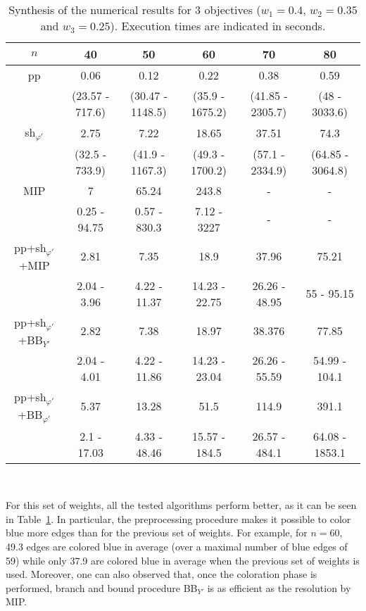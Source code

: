 \documentclass[final,3p,times]{elsarticle}
\begin{document}
\begin{table}[!h]
  \begin{center}
  {\small \begin{tabular}{|c|ccccc|}    \hline
      \rule[1pt]{0pt}{13pt} 
   $n$ & 40&50&60&70&80\\
    \hline
    pp  &0.06&0.12&0.22&0.38&0.59\\
    	 &(23.57 - 717.6)&(30.47 - 1148.5)&(35.9 - 1675.2)&(41.85 - 2305.7)&(48 - 3033.6)\\
    sh$_{\varphi'}$&2.75&7.22&18.65&37.51&74.3\\
         &(32.5 - 733.9)&(41.9 - 1167.3)&(49.3 - 1700.2)&(57.1 - 2334.9)&(64.85 - 3064.8)\\
   \hline
 MIP&7&65.24&243.8&-&-\\
      &0.25 - 94.75&0.57 - 830.3 &7.12 - 3227& - & - \\
pp+sh$_{\varphi'}$+MIP&2.81&7.35&18.9&37.96&75.21\\
  &2.04 - 3.96&4.22 - 11.37&14.23 - 22.75&26.26 - 48.95&55 - 95.15\\
pp+sh$_{\varphi'}$+BB$_{Y'}$&2.82&7.38&18.97&38.376&77.85\\
     &2.04 - 4.01&4.22 - 11.86&14.23 - 23.04&26.26 - 55.59&54.99 - 104.1\\
pp+sh$_{\varphi'}$+BB$_{\varphi'}$&5.37&13.28&51.5&114.9&391.1\\
    &2.1 - 17.03&4.33 - 48.46&15.57 - 184.5&26.57 - 484.1&64.08 - 1853.1\\
  \hline
    \end{tabular}\\ [2ex]
}
\end{center}
\caption{\label{tabPL26} Synthesis of the numerical results for 3 objectives ($w_1 = 0.4$, $w_2 = 0.35$ and $w_3 = 0.25$). Execution times are indicated in seconds. 
}
\end{table}

For this set of weights, all the tested algorithms perform better, as it can be seen in
Table~\ref{tabPL26}. In particular, the preprocessing procedure makes it possible to color
blue more edges than for the previous set of weights. For example, for $n = 60$, 49.3 edges are colored blue
in average (over a maximal number of blue edges of 59)
while only 37.9 are colored blue in average when the
previous set of weights is used. Moreover, one can also observed that,
once the coloration phase is performed, branch and bound procedure
BB$_{Y'}$ is as efficient as the
resolution by MIP.
\end{document}
